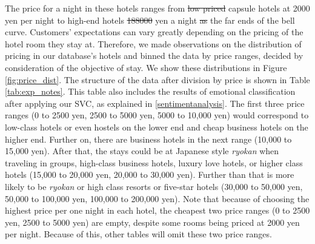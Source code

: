 \documentclass[smallextended,natbib]{svjour3}       %
\providecommand{\DIFadd}[1]{{\protect\color{blue}\uwave{#1}}} %
\providecommand{\DIFdel}[1]{{\protect\color{red}\sout{#1}}}                      %
\providecommand{\DIFaddbegin}{} %
\providecommand{\DIFaddend}{} %
\providecommand{\DIFdelbegin}{} %
\providecommand{\DIFdelend}{} %
\newcommand{\DIFscaledelfig}{0.5}
\newlength{\DIFdelgraphicswidth} %
\newlength{\DIFdelgraphicsheight} %
\newcommand{\DIFaddincludegraphics}[2][]{{\color{blue}\fbox{\DIFOincludegraphics[#1]{#2}}}} %
\newcommand{\DIFdelincludegraphics}[2][]{%
\sbox{\DIFdelgraphicsbox}{\DIFOincludegraphics[#1]{#2}}%
\settoboxwidth{\DIFdelgraphicswidth}{\DIFdelgraphicsbox} %
\settoboxtotalheight{\DIFdelgraphicsheight}{\DIFdelgraphicsbox} %
\scalebox{\DIFscaledelfig}{%
\parbox[b]{\DIFdelgraphicswidth}{\usebox{\DIFdelgraphicsbox}\\[-\baselineskip] \rule{\DIFdelgraphicswidth}{0em}}\llap{\resizebox{\DIFdelgraphicswidth}{\DIFdelgraphicsheight}{%
\setlength{\unitlength}{\DIFdelgraphicswidth}%
\begin{picture}(1,1)%
\thicklines\linethickness{2pt} %
{\color[rgb]{1,0,0}\put(0,0){\framebox(1,1){}}}%
{\color[rgb]{1,0,0}\put(0,0){\line( 1,1){1}}}%
{\color[rgb]{1,0,0}\put(0,1){\line(1,-1){1}}}%
\end{picture}%
}\hspace*{3pt}}} %
} %
\DeclareRobustCommand{\DIFaddbegin}{\DIFOaddbegin \let\includegraphics\DIFaddincludegraphics} %
\DeclareRobustCommand{\DIFaddend}{\DIFOaddend \let\includegraphics\DIFOincludegraphics} %
\DeclareRobustCommand{\DIFdelbegin}{\DIFOdelbegin \let\includegraphics\DIFdelincludegraphics} %
\DeclareRobustCommand{\DIFdelend}{\DIFOaddend \let\includegraphics\DIFOincludegraphics} %
\begin{document}
    The price for a night in these hotels ranges from \DIFdelbegin \DIFdel{low priced }\DIFdelend \DIFaddbegin \DIFadd{cheap }\DIFaddend capsule hotels at 2000 yen per night to high-end hotels \DIFdelbegin \DIFdel{\num[group-separator={,}]{188000} }\DIFdelend \DIFaddbegin \DIFadd{188,000 }\DIFaddend yen a night \DIFdelbegin \DIFdel{as }\DIFdelend \DIFaddbegin \DIFadd{at }\DIFaddend the far ends of the bell curve. Customers' expectations can vary greatly depending on the pricing of the hotel room they stay at. Therefore, we made observations on the distribution of pricing in our database's hotels and binned the data by price ranges, decided by consideration of the objective of stay. We show these distributions in Figure \ref{fig:price_dist}. The structure of the data after division by price is shown in Table \ref{tab:exp_notes}. This table also includes the results of emotional classification after applying our SVC, as explained in \ref{sentimentanalysis}. The first three price ranges (0 to 2500 yen, 2500 to 5000 yen, 5000 to 10,000 yen) would correspond to low-class hotels or even hostels on the lower end and cheap business hotels on the higher end. Further on, there are business hotels in the next range (10,000 to 15,000 yen). After that, the stays could be at Japanese style \textit{ryokan} when traveling in groups, high-class business hotels, luxury love hotels, or higher class hotels (15,000 to 20,000 yen, 20,000 to 30,000 yen). Further than that is more likely to be \textit{ryokan} or high class resorts or five-star hotels (30,000 to 50,000 yen, 50,000 to 100,000 yen, 100,000 to 200,000 yen). Note that because of choosing the highest price per one night in each hotel, the cheapest two price ranges (0 to 2500 yen, 2500 to 5000 yen) are empty, despite some rooms being priced at 2000 yen per night. Because of this, other tables will omit these two price ranges.
\end{document}
